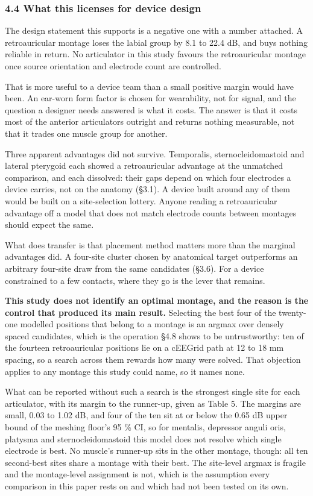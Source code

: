 \documentclass[manuscript,review,anonymous]{acmart}
\newcounter{none}
\begin{document}
\subsubsection{4.4 What this licenses for device design}\label{what-this-licenses-for-device-design}

The design statement this supports is a negative one with a number attached. A
retroauricular montage loses the labial group by 8.1 to 22.4 dB, and buys
nothing reliable in return. No articulator in this study favours the
retroauricular montage once source orientation and electrode count are
controlled.

That is more useful to a device team than a small positive margin would have
been. An ear-worn form factor is chosen for wearability, not for signal, and the
question a designer needs answered is what it costs. The answer is that it costs
most of the anterior articulators outright and returns nothing measurable, not
that it trades one muscle group for another.

Three apparent advantages did not survive. Temporalis, sternocleidomastoid and
lateral pterygoid each showed a retroauricular advantage at the unmatched
comparison, and each dissolved: their gaps depend on which four electrodes a
device carries, not on the anatomy (\S{}3.1). A device built around any of them
would be built on a site-selection lottery. Anyone reading a retroauricular
advantage off a model that does not match electrode counts between montages
should expect the same.

What does transfer is that placement method matters more than the marginal
advantages did. A four-site cluster chosen by anatomical target outperforms an
arbitrary four-site draw from the same candidates (\S{}3.6). For a device
constrained to a few contacts, where they go is the lever that remains.

\textbf{This study does not identify an optimal montage, and the reason is the control
that produced its main result.} Selecting the best four of the twenty-one modelled positions that belong to a montage is an argmax over densely spaced candidates, which is the
operation \S{}4.8 shows to be untrustworthy: ten of the fourteen retroauricular
positions lie on a cEEGrid path at 12 to 18 mm spacing, so a search across them
rewards how many were solved. That objection applies to any montage this study
could name, so it names none.

What can be reported without such a search is the strongest single site for each
articulator, with its margin to the runner-up, given as Table 5. The margins are
small, 0.03 to 1.02 dB, and four of the ten sit at or below the 0.65 dB upper
bound of the meshing floor's 95 \% CI, so for mentalis, depressor anguli oris,
platysma and sternocleidomastoid this model does not resolve which single
electrode is best. No muscle's runner-up sits in the other montage, though: all
ten second-best sites share a montage with their best. The site-level argmax is
fragile and the montage-level assignment is not, which is the assumption every
comparison in this paper rests on and which had not been tested on its own.
\end{document}
